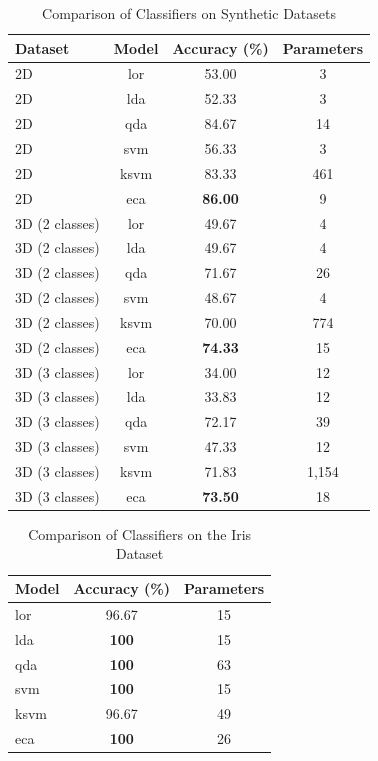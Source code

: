 \documentclass[conference]{IEEEtran}
\begin{document}
\begin{table}[ht]
    \caption{Comparison of Classifiers on Synthetic Datasets}
    \centering
    \begin{tabular}{@{}lccc@{}}
        \toprule
        \textbf{Dataset} & \textbf{Model} & \textbf{Accuracy (\%)} & \textbf{Parameters} \\ \midrule
        2D & \Gls{lor} & 53.00 & 3 \\
        2D & \Gls{lda} & 52.33 & 3 \\
        2D & \Gls{qda} & 84.67 & 14 \\
        2D & \Gls{svm} & 56.33 & 3 \\
        2D & \Gls{ksvm} & 83.33 & 461 \\
        2D & \Gls{eca} & \textbf{86.00} & 9 \\ \midrule
        3D (2 classes) & \Gls{lor} & 49.67 & 4 \\
        3D (2 classes) & \Gls{lda} & 49.67 & 4 \\
        3D (2 classes) & \Gls{qda} & 71.67 & 26 \\
        3D (2 classes) & \Gls{svm} & 48.67 & 4 \\
        3D (2 classes) & \Gls{ksvm} & 70.00 & 774 \\
        3D (2 classes) & \Gls{eca} & \textbf{74.33} & 15 \\ \midrule
        3D (3 classes) & \Gls{lor} & 34.00 & 12 \\
        3D (3 classes) & \Gls{lda} & 33.83 & 12 \\
        3D (3 classes) & \Gls{qda} & 72.17 & 39 \\
        3D (3 classes) & \Gls{svm} & 47.33 & 12 \\
        3D (3 classes) & \Gls{ksvm} & 71.83 & 1,154 \\
        3D (3 classes) & \Gls{eca} & \textbf{73.50} & 18 \\ \bottomrule
    \end{tabular}
    \label{tab:synthetic}
\end{table}

\begin{table}[ht]
    \caption{Comparison of Classifiers on the Iris Dataset}
    \centering
    \begin{tabular}{@{}lcc@{}}
        \toprule
        \textbf{Model} & \textbf{Accuracy (\%)} & \textbf{Parameters} \\ \midrule
        \Gls{lor} & 96.67 & 15 \\
        \Gls{lda} & \textbf{100} & 15 \\
        \Gls{qda} & \textbf{100} & 63 \\
        \Gls{svm} & \textbf{100} & 15 \\
        \Gls{ksvm} & 96.67 & 49 \\
        \Gls{eca} & \textbf{100} & 26 \\ \bottomrule
    \end{tabular}
    \label{tab:iris}
\end{table}
\end{document}

